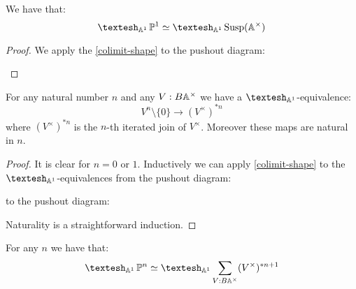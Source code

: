 \begin{proposition}
We have that:
\[\shape_{\A^1} \bP^1 \simeq \shape_{\A^1} \Susp(\A^\times)\]
\end{proposition}

\begin{proof}
We apply the \cref{colimit-shape} to the pushout diagram:
 \begin{center}
  \end{center}
  \end{proof}

\begin{lemma}\label{free-module-minus-point-shape}
For any natural number $n$ and any $V:B\mathbb{A}^\times$ we have a $\shape_{\A^1}$-equivalence:
\[V^{n}\setminus\{0\} \to (V^\times)^{*n}\]
where $(V^\times)^{*n}$ is the $n$-th iterated join of $V^\times$. Moreover these maps are natural in $n$.
\end{lemma}

\begin{proof}
It is clear for $n=0$ or $1$. Inductively we can apply \cref{colimit-shape} to the $\shape_{\A^1}$-equivalences from the pushout diagram:
 \begin{center}
  \end{center}
  to the pushout diagram:
   \begin{center}
  \end{center}
  Naturality is a straightforward induction.
\end{proof}

\begin{proposition}
For any $n$ we have that:
\[\shape_{\A^1} \bP^n \simeq \shape_{\A^1} \sum_{V:B\A^\times} (V^\times)^{*n+1}\]
\end{proposition}


